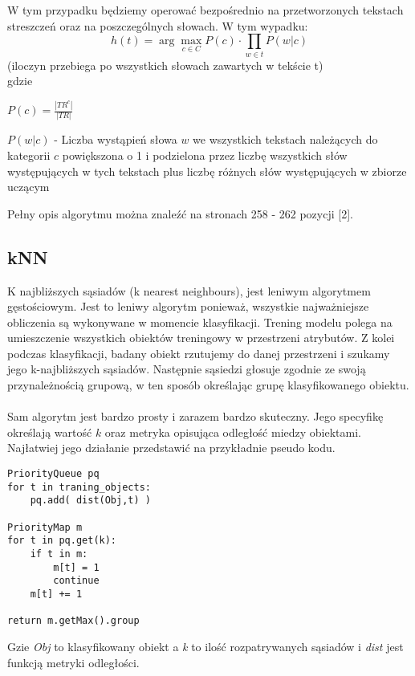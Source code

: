 \documentclass[a4paper,12pt]{article}
\begin{document}
		W tym przypadku będziemy operować bezpośrednio na 
		przetworzonych tekstach streszczeń oraz na 
		poszczególnych słowach.
		W tym wypadku:
		\[ h(t) = \arg\max_{c \in C}{
			P(c) \cdot \prod_{w \in t} P(w|c)	
		} \]
		(iloczyn przebiega po wszystkich słowach zawartych
		w tekście t)\\
		gdzie
		\begin{list}{}{}
		\item
			$P(c) = \frac{|TR^c|}{|TR|}$
		\item
			$P(w|c)$ - Liczba wystąpień słowa $w$ we wszystkich tekstach należących do kategorii $c$ powiększona o 1 i podzielona 
			przez liczbę wszystkich słów występujących w tych
			tekstach plus liczbę różnych słów występujących w 
			zbiorze uczącym
		\end{list}

		Pełny opis algorytmu można znaleźć  na stronach 258 - 262
		pozycji [2].
	
\subsection{kNN}
K najbliższych sąsiadów (k nearest neighbours), jest leniwym algorytmem
gęstościowym. Jest to leniwy algorytm ponieważ, wszystkie najważniejsze
obliczenia są wykonywane w momencie klasyfikacji. Trening modelu polega na
umieszczenie wszystkich obiektów treningowy w przestrzeni atrybutów. Z kolei
podczas klasyfikacji, badany obiekt rzutujemy do danej przestrzeni i szukamy
jego k-najbliższych sąsiadów. Następnie sąsiedzi głosuje zgodnie ze swoją
przynależnością grupową, w ten sposób określając grupę klasyfikowanego
obiektu. 

\paragraph{} Sam algorytm jest bardzo prosty i zarazem bardzo skuteczny. Jego
specyfikę określają wartość $k$ oraz metryka opisująca odległość miedzy
obiektami. Najłatwiej jego działanie przedstawić na przykładnie pseudo kodu.

\begin{verbatim}
PriorityQueue pq
for t in traning_objects:
    pq.add( dist(Obj,t) )

PriorityMap m
for t in pq.get(k):
    if t in m:
        m[t] = 1
        continue
    m[t] += 1 

return m.getMax().group
\end{verbatim}

Gzie \textit{Obj} to klasyfikowany obiekt a \textit{k} to ilość
rozpatrywanych sąsiadów i \textit{dist} jest funkcją metryki odległości.
\end{document}
